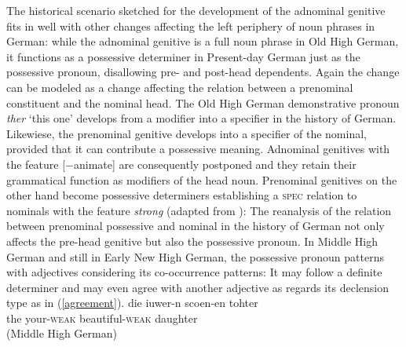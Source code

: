 \documentclass[output=paper
                ,modfonts
                ,nonflat
	        ,collection
	        ,collectionchapter
	        ,collectiontoclongg
 	        ,biblatex
                ,babelshorthands
                ,newtxmath
                ,draftmode
                ,colorlinks, citecolor=brown
]{./langsci/langscibook}
\begin{document}
The historical scenario sketched for the development of the adnominal genitive fits in well with other changes affecting the left periphery of noun phrases in German: while the adnominal genitive is a full noun phrase in Old High German, it functions as a possessive determiner in Present-day German just as the possessive pronoun, disallowing pre- and post-head dependents. Again the change can be modeled as a change affecting the relation between a prenominal constituent and the nominal head. The Old High German demonstrative pronoun \textit{ther} `this one' develops from a modifier into a specifier in the history of German. Likewiese, the prenominal genitive develops into a specifier of the nominal, provided that it can contribute a possessive meaning. Adnominal genitives with the feature [$-$animate] are consequently postponed and they retain their grammatical function as modifiers of the head noun. Prenominal genitives on the other hand become possessive determiners establishing a \textsc{spec} relation to nominals with the \decl feature \textit{strong} (adapted from \cite[54]{PoSa94}):
\ea 
{}
\z 
The reanalysis of the relation between prenominal possessive and nominal in the history of German not only affects the pre-head genitive but also the possessive pronoun. In Middle High German and still in Early New High German, the possessive pronoun patterns with adjectives considering its co-occurrence patterns: It may follow a definite determiner and may even agree with another adjective as regards its declension type as in (\ref{agreement}). 
\eal
\ex \label{agreement}
\gll  die iuwer-n scoen-en tohter \\ the your-\textsc{weak} beautiful-\textsc{weak} daughter  \\ \hfill (Middle High German)
\end{document}
